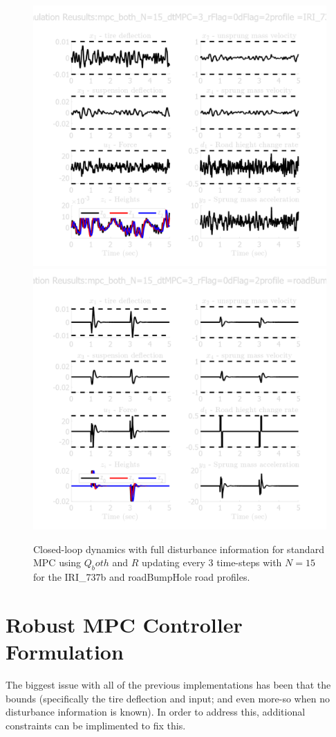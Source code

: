\documentclass[]{IEEEtran}
\begin{document}
\begin{figure}[h]
    \centering
    \includegraphics[width = 0.49 \columnwidth]{figs/results_mpc_both_N=15_dtMPC=3_rFlag=0_dFlag=2_IRI_737b.png}
    \includegraphics[width = 0.49 \columnwidth]{figs/results_mpc_both_N=15_dtMPC=3_rFlag=0_dFlag=2_roadBumpHole.png}
    \caption{Closed-loop dynamics with full disturbance information for standard MPC using $Q_both$ and $R$ updating every 3 time-steps with $N=15$ for the IRI\_737b and roadBumpHole road profiles.} \label{fig:mpc_N15_dt3_d2_r0}
\end{figure}

\newpage
\section{Robust MPC Controller Formulation}
The biggest issue with all of the previous implementations has been that the bounds (specifically the tire deflection and input; and even more-so when no disturbance information is known).
In order to address this, additional constraints can be implimented to fix this.
\end{document}
